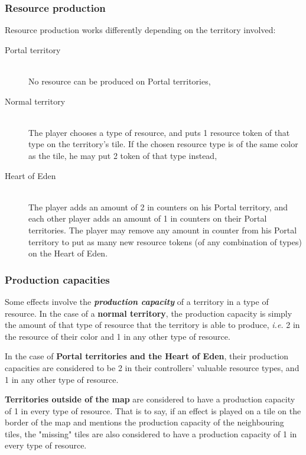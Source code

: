 \documentclass[a4paper]{article}
\begin{document}
    \subsubsection{Resource production}
    \vspace{-1em}
      \hspace{-2em} Resource production works differently depending on the
      territory involved:
      \vspace{-1.3em}
      \begin{description}
          \item[Portal territory] \hfill \\
          No resource can be produced on Portal territories,
          \item[Normal territory] \hfill \\
          The player chooses a type of resource, and puts 1 resource token of that
          type on the territory's tile.
          If the chosen resource type is of the same color as the tile,
          he may put 2 token of that type instead,
          \item[Heart of Eden] \hfill \\
          The player adds an amount of 2 in counters on his Portal territory, and
          each other player adds an amount of 1 in counters on their Portal territories.
          The player may remove any amount in counter from his Portal territory to put
          as many new resource tokens (of any combination of types) on the Heart of Eden.
      \end{description}
  
    \subsubsection{Production capacities}
      \vspace{-1em}
      Some effects involve the \textbf{\textit{production capacity}} of
      a territory in a type of resource.
      In the case of a \textbf{normal territory}, the production capacity is simply
      the amount of that type of resource that the territory is able to produce,
      \textit{i.e.} 2 in the resource of their color and 1 in any other type of resource.
      
      In the case of \textbf{Portal territories and the Heart of Eden},
      their production capacities are considered to be 2 in their controllers'
      valuable resource types, and 1 in any other type of resource.
    
      \textbf{Territories outside of the map} are considered to have a
      production capacity of 1 in every type of resource.
      That is to say, if an effect is played on a tile on the border
      of the map and mentions the production capacity of the neighbouring tiles,
      the "missing" tiles are also considered to have a production capacity of
      1 in every type of resource.
\end{document}
